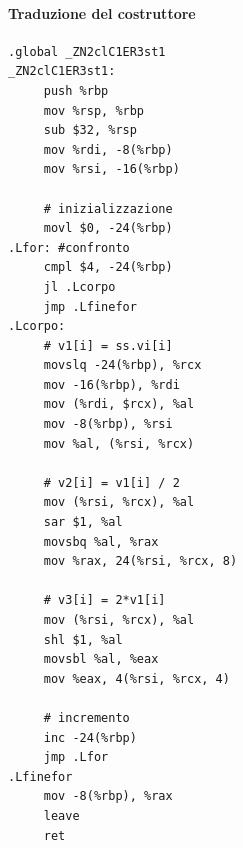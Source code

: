 \documentclass[11pt]{report}
\theoremstyle{definition}
\begin{document}
\paragraph{Traduzione del costruttore}
\begin{verbatim}
.global _ZN2clC1ER3st1
_ZN2clC1ER3st1:
     push %rbp
     mov %rsp, %rbp
     sub $32, %rsp
     mov %rdi, -8(%rbp)
     mov %rsi, -16(%rbp)
     
     # inizializzazione
     movl $0, -24(%rbp)
.Lfor: #confronto
     cmpl $4, -24(%rbp)
     jl .Lcorpo
     jmp .Lfinefor
.Lcorpo:
     # v1[i] = ss.vi[i]
     movslq -24(%rbp), %rcx
     mov -16(%rbp), %rdi
     mov (%rdi, $rcx), %al
     mov -8(%rbp), %rsi
     mov %al, (%rsi, %rcx)
     
     # v2[i] = v1[i] / 2
     mov (%rsi, %rcx), %al
     sar $1, %al
     movsbq %al, %rax
     mov %rax, 24(%rsi, %rcx, 8)
     
     # v3[i] = 2*v1[i]
     mov (%rsi, %rcx), %al
     shl $1, %al
     movsbl %al, %eax
     mov %eax, 4(%rsi, %rcx, 4)
     
     # incremento     
     inc -24(%rbp)
     jmp .Lfor
.Lfinefor 
     mov -8(%rbp), %rax
     leave
     ret
\end{verbatim}
\end{document}
